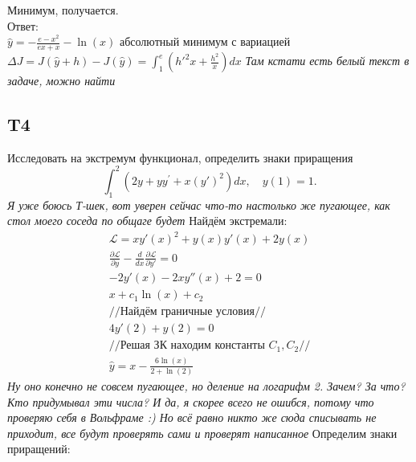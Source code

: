 \documentclass{article}
\newcommand{\Lagr}{\mathcal{L}}
\begin{document}
Минимум, получается.\\
Ответ: \\
$\hat y = -\frac{e-x^2}{e x+x}-\ln (x)$  абсолютный минимум с вариацией $\Delta J = J(\hat y + h) - J(\hat y) =\int_1^e  \left(h'^2 x +\frac{h^2}{x} \right) dx$ 
 \textcolor[rgb]{0.480469,0.566406,0.480469}{\textit{Там кстати есть белый текст в задаче, можно найти}}                                               

\subsection{T4}
Исследовать на экстремум функционал, определить знаки приращения
\begin{equation}
    \int_{1}^{2}\left(2 y+y y^{\prime}+x\left(y'\right)^2\right) d x, \quad y(1)=1 .
\end{equation}
 \textcolor[rgb]{0.480469,0.566406,0.480469}{\textit{Я уже боюсь Т-шек, вот уверен сейчас что-то настолько же пугающее, как стол моего соседа по общаге будет}}  
 Найдём экстремали:
 \begin{gather*}
    \Lagr = x y'(x)^2+y(x) y'(x)+2 y(x)\\
    \frac{\partial \Lagr}{\partial y}  - \frac{d }{d x} \frac{\partial \Lagr}{\partial y'} =0   \\
    -2 y'(x)-2 x y''(x)+2=0\\
    x+c_1 \ln (x)+c_2\\
    //\text{Найдём граничные условия}//\\
    4 y'(2)+y(2) = 0\\
    //\text{Решая ЗК находим константы } C_1, C_2//\\
    \hat y=x-\frac{6 \ln (x)}{2+\ln (2)}
 \end{gather*}  
 \textcolor[rgb]{0.480469,0.566406,0.480469}{\textit{Ну оно конечно не совсем пугающее, но деление на логарифм 2. Зачем? За что? Кто придумывал эти числа? И да, я скорее всего не ошибся, потому что проверяю себя в Вольфраме :) Но всё равно никто же сюда списывать не приходит, все будут проверять сами и проверят написанное}}
 Определим знаки приращений:
\end{document}
